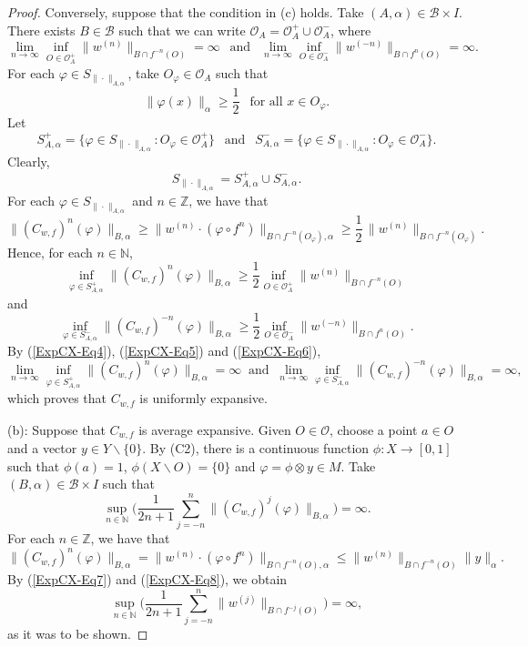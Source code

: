 \documentclass[10pt,a4paper]{amsart}
\newcommand{\N}{\mathbb{N}} %
\newcommand{\Z}{\mathbb{Z}} %
\newcommand{\cB}{\mathcal{B}}
\newcommand{\cO}{\mathcal{O}}
\begin{document}
\begin{proof}
Conversely, suppose that the condition in (c) holds. Take $(A,\alpha) \in \cB \times I$.
There exists $B \in \cB$ such that we can write $\cO_A = \cO_A^+ \cup \cO_A^-$, where
\begin{equation}\label{ExpCX-Eq4}
\lim_{n \to \infty} \inf_{O \in \cO_A^+} \|w^{(n)}\|_{B\cap f^{-n}(O)} = \infty \ \ \text{ and } \ \ 
\lim_{n \to \infty} \inf_{O \in \cO_A^-} \|w^{(-n)}\|_{B\cap f^{n}(O)} = \infty.
\end{equation}
For each $\varphi \in S_{\|\cdot\|_{A,\alpha}}$, take $O_\varphi \in \cO_A$ such that
\[
\|\varphi(x)\|_\alpha \geq \frac{1}{2} \ \ \text{ for all } x \in O_\varphi.
\]
Let
\[
S^{+}_{A,\alpha} =\{\varphi \in S_{\|\cdot\|_{A,\alpha}} : O_\varphi \in \cO_A^+\} \ \ \text{ and } \ \
S^{-}_{A,\alpha} =\{\varphi \in S_{\|\cdot\|_{A,\alpha}} : O_\varphi \in \cO_A^-\}.
\]
Clearly, 
\[
S_{\|\cdot\|_{A,\alpha}} = S^{+}_{A,\alpha} \cup S^{-}_{A,\alpha}.
\] 
For each $\varphi \in S_{\|\cdot\|_{A,\alpha}}$ and $n \in \Z$, we have that
\[
\|(C_{w,f})^n(\varphi)\|_{B,\alpha} \geq \|w^{(n)} \cdot (\varphi \circ f^n)\|_{B \cap f^{-n}(O_\varphi),\alpha} 
  \geq \frac{1}{2}\, \|w^{(n)}\|_{B \cap f^{-n}(O_\varphi)}.
\]
Hence, for each $n \in \N$,
\begin{equation}\label{ExpCX-Eq5}
\inf_{\varphi \in S^{+}_{A,\alpha}} \|(C_{w,f})^n(\varphi)\|_{B,\alpha} 
  \geq \frac{1}{2} \inf_{O \in \cO_A^+} \|w^{(n)}\|_{B\cap f^{-n}(O)}
\end{equation}
and
\begin{equation}\label{ExpCX-Eq6}
\inf_{\varphi \in S^{-}_{A,\alpha}} \|(C_{w,f})^{-n}(\varphi)\|_{B,\alpha} 
  \geq \frac{1}{2} \inf_{O \in \cO_A^-} \|w^{(-n)}\|_{B\cap f^n(O)}.
\end{equation}
By (\ref{ExpCX-Eq4}), (\ref{ExpCX-Eq5}) and (\ref{ExpCX-Eq6}),
\[
\lim_{n \to \infty} \inf_{\varphi \in S^{+}_{A,\alpha}} \|(C_{w,f})^n(\varphi)\|_{B,\alpha} = \infty \ \text{ and } \ 
\lim_{n \to \infty} \inf_{\varphi \in S^{-}_{A,\alpha}} \|(C_{w,f})^{-n}(\varphi)\|_{B,\alpha} = \infty,
\]
which proves that $C_{w,f}$ is uniformly expansive.

\smallskip\noindent
(b): Suppose that $C_{w,f}$ is average expansive. Given $O \in \cO$, choose a point $a \in O$ and a vector $y \in Y \backslash \{0\}$.
By (C2), there is a continuous function $\phi : X \to [0,1]$ such that 
$\phi(a) = 1$, $\phi(X \backslash O) = \{0\}$ and $\varphi = \phi \otimes y \in M$.
Take $(B,\alpha) \in \cB \times I$ such that
\begin{equation}\label{ExpCX-Eq7}
\sup_{n \in \N} \Big(\frac{1}{2n+1} \sum_{j=-n}^n \|(C_{w,f})^j(\varphi)\|_{B,\alpha}\Big) = \infty.
\end{equation}
For each $n \in \Z$, we have that
\begin{equation}\label{ExpCX-Eq8}
\|(C_{w,f})^n(\varphi)\|_{B,\alpha} = \|w^{(n)} \cdot (\varphi \circ f^n)\|_{B \cap f^{-n}(O),\alpha} 
  \leq \|w^{(n)}\|_{B \cap f^{-n}(O)} \|y\|_\alpha.
\end{equation}
By (\ref{ExpCX-Eq7}) and (\ref{ExpCX-Eq8}), we obtain
\[
\sup_{n \in \N} \Big(\frac{1}{2n+1} \sum_{j=-n}^n \|w^{(j)}\|_{B \cap f^{-j}(O)}\Big) = \infty,
\]
as it was to be shown.


\end{proof}
\end{document}
